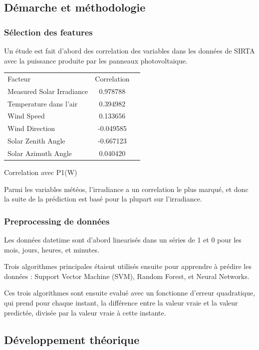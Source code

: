 \documentclass[a4paper]{article}
\begin{document}
\begin{multicols}{2}

\subsection{Démarche et méthodologie}
\subsubsection{Sélection des features}
Un étude est fait d’abord des correlation des variables dans les données de SIRTA avec la puissance produite par les panneaux photovoltaique. 


\begin{tabular}{l c r}
  Facteur & Correlation \\
  Measured Solar Irradiance & 0.978788 \\
  Temperature dans l’air & 0.394982 \\
  Wind Speed & 0.133656 \\
  Wind Direction & -0.049585 \\
  Solar Zenith Angle & -0.667123 \\
  Solar Azimuth Angle & 0.040420 \\
\end{tabular}
\tablename{ Correlation avec P1(W)}

Parmi les variables météos, l’irradiance a un correlation le plus marqué, et donc la suite de la prédiction est basé pour la plupart sur l’irradiance.

\subsubsection{Preprocessing de données}

Les données datetime sont d'abord linearisés dans un séries de 1 et 0 pour les mois, jours, heures, et minutes. 

Trois algorithmes principales étaient utilisés ensuite pour apprendre à prédire les données : Support Vector Machine (SVM), Random Forest, et Neural Networks.

Ces trois algorithmes sont ensuite evalué avec un fonctionne d'erreur quadratique, qui prend pour chaque instant, la différence entre la valeur vraie et la valeur predictée, divisée par la valeur vraie à cette instante. 

\subsection{Développement théorique}

\end{multicols}
\end{document}
